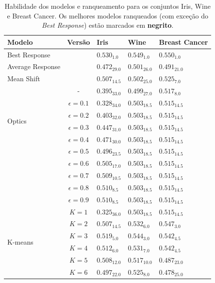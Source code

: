 \begin{table}[h]
    \centering
    \tiny
    \caption{Habilidade dos modelos e ranqueamento para os conjuntos Iris, Wine e Breast Cancer. Os melhores modelos ranqueados (com exceção do \textit{Best Response}) estão marcados em \textbf{negrito}.}
        \begin{tabular}{l|c|lll}
\midrule
Modelo & Versão &  Iris & Wine & Breast Cancer \\
\midrule
Best Response &  & $0.530_{1.0}$ & $0.549_{1.0}$ & $0.550_{1.0}$ \\
\midrule
Average Response &  & $0.472_{29.0}$ & $0.501_{26.0}$ & $0.491_{21.0}$ \\
\midrule
Mean Shift &  & $0.507_{14.5}$ & $0.502_{25.0}$ & $0.525_{7.0}$ \\
\midrule
\multirow[t]{6}{*}{Optics} & - & $0.395_{33.0}$ & $0.499_{27.0}$ & $0.517_{8.0}$ \\
\midrule
\multirow[t]{9}{*}{DBSCAN} & $\epsilon=0.1$ & $0.328_{34.0}$ & $0.503_{18.5}$ & $0.515_{14.5}$ \\
 & $\epsilon=0.2$ & $0.403_{32.0}$ & $0.503_{18.5}$ & $0.515_{14.5}$ \\
 & $\epsilon=0.3$ & $0.447_{31.0}$ & $0.503_{18.5}$ & $0.515_{14.5}$ \\
 & $\epsilon=0.4$ & $0.471_{30.0}$ & $0.503_{18.5}$ & $0.515_{14.5}$ \\
 & $\epsilon=0.5$ & $0.496_{23.5}$ & $0.503_{18.5}$ & $0.515_{14.5}$ \\
 & $\epsilon=0.6$ & $0.505_{17.0}$ & $0.503_{18.5}$ & $0.515_{14.5}$ \\
 & $\epsilon=0.7$ & $0.509_{10.5}$ & $0.503_{18.5}$ & $0.515_{14.5}$ \\
 & $\epsilon=0.8$ & $0.510_{8.5}$ & $0.503_{18.5}$ & $0.515_{14.5}$ \\
 & $\epsilon=0.9$ & $0.510_{8.5}$ & $0.503_{18.5}$ & $0.515_{14.5}$ \\
\midrule
\multirow[t]{8}{*}{K-means} & $K=1$ & $0.325_{36.0}$ & $0.503_{18.5}$ & $0.515_{14.5}$ \\
 & $K=2$ & $0.507_{14.5}$ & $0.532_{6.0}$ & $0.547_{3.0}$ \\
 & $K=3$ & $0.519_{5.0}$ & $0.544_{3.0}$ & $0.542_{4.5}$ \\
 & $K=4$ & $0.512_{6.0}$ & $0.531_{7.0}$ & $0.542_{4.5}$ \\
 & $K=5$ & $0.508_{12.0}$ & $0.517_{10.0}$ & $0.487_{23.0}$ \\
 & $K=6$ & $0.497_{22.0}$ & $0.525_{8.0}$ & $0.478_{25.0}$ \\

\end{tabular}
\end{table}
